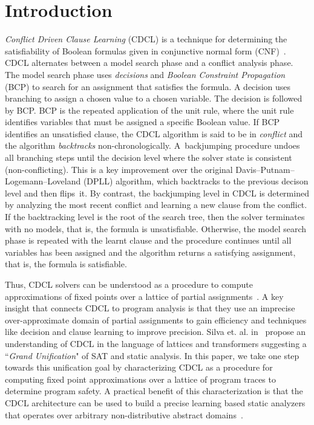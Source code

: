 \section{Introduction}

\emph{Conflict Driven Clause Learning} (CDCL) is a technique for determining
the satisfiability of Boolean formulas given in conjunctive normal form
(CNF)~\cite{cdcl}.  CDCL alternates between a model search phase and a
conflict analysis phase.  The model search phase uses \emph{decisions} and
\emph{Boolean Constraint Propagation} (BCP) to search for an assignment that
satisfies the formula.  A decision uses branching to assign a chosen value
to a chosen variable.  The decision is followed by BCP.  BCP is the repeated
application of the unit rule, where the unit rule identifies variables that
must be assigned a specific Boolean value.  If BCP identifies an unsatisfied
clause, the CDCL algorithm is said to be in \emph{conflict} and the
algorithm \emph{backtracks} non-chronologically.  A~backjumping procedure
undoes all branching steps until the decision level where the solver state
is consistent (non-conflicting).  This is a key improvement over the
original Davis--Putnam--Logemann--Loveland (DPLL) algorithm, which
backtracks to the previous decison level and then flips~it.  By contrast,
the backjumping level in CDCL is determined by analyzing the most recent
conflict and learning a new clause from the conflict.  If the backtracking
level is the root of the search tree, then the solver terminates with no
models, that is, the formula is unsatisfiable.  Otherwise, the model search
phase is repeated with the learnt clause and the procedure continues until
all variables has been assigned and the algorithm returns a satisfying
assignment, that is, the formula is satisfiable.

%
Thus, CDCL solvers can be understood as a procedure to compute approximations of fixed 
points over a lattice of partial assignments~\cite{sas12}.  A key insight 
that connects CDCL to program analysis is that they use an imprecise 
over-approximate domain of partial assignments to gain efficiency and 
techniques like decision and clause learning to improve precision.  
%
Silva et. al. in~\cite{popl2014} propose an understanding of CDCL in the language
of lattices and transformers suggesting a ``\emph{Grand Unification}" of SAT
and static analysis.
%
In this paper, we take one step towards this unification goal by characterizing CDCL
as a procedure for computing fixed point approximations over a lattice
of program traces to determine program safety.  
A practical benefit of this characterization is that the CDCL architecture can
be used to build a precise learning based static analyzers that operates over 
arbitrary non-distributive abstract domains~\cite{atva2017}.  \\
%


